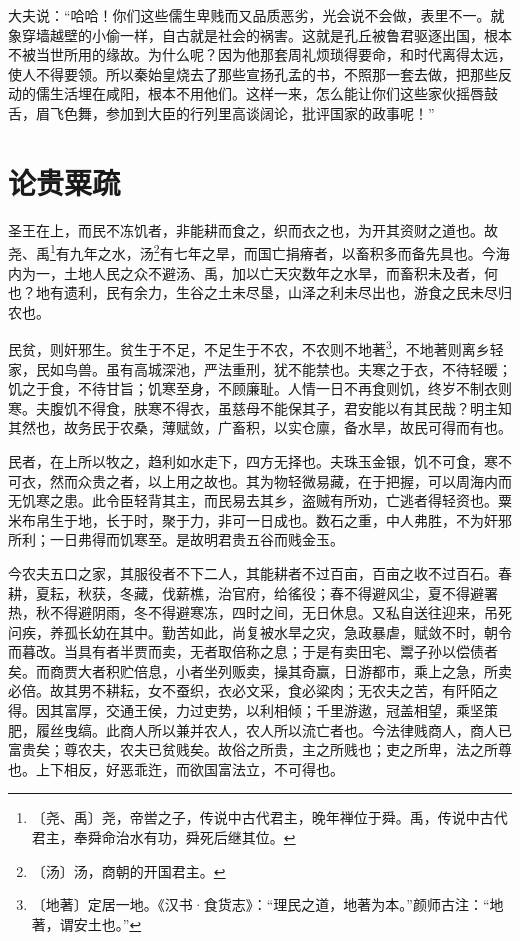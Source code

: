 \documentclass[12pt,UTF-8,openany]{ctexbook}
\begin{document}
\begin{normalsize}
    大夫说：“哈哈！你们这些儒生卑贱而又品质恶劣，光会说不会做，表里不一。就象穿墙越壁的小偷一样，自古就是社会的祸害。这就是孔丘被鲁君驱逐出国，根本不被当世所用的缘故。为什么呢？因为他那套周礼烦琐得要命，和时代离得太远，使人不得要领。所以秦始皇烧去了那些宣扬孔孟的书，不照那一套去做，把那些反动的儒生活埋在咸阳，根本不用他们。这样一来，怎么能让你们这些家伙摇唇鼓舌，眉飞色舞，参加到大臣的行列里高谈阔论，批评国家的政事呢！”
    
\end{normalsize}



\chapter{论贵粟疏}

\begin{normalsize}
    
    圣王在上，而民不冻饥者，非能耕而食之，织而衣之也，为开其资财之道也。故尧、禹\footnote{〔尧、禹〕尧，帝喾之子，传说中古代君主，晚年禅位于舜。禹，传说中古代君主，奉舜命治水有功，舜死后继其位。}有九年之水，汤\footnote{〔汤〕汤，商朝的开国君主。}有七年之旱，而国亡捐瘠者，以畜积多而备先具也。今海内为一，土地人民之众不避汤、禹，加以亡天灾数年之水旱，而畜积未及者，何也？地有遗利，民有余力，生谷之土未尽垦，山泽之利未尽出也，游食之民未尽归农也。
    
    民贫，则奸邪生。贫生于不足，不足生于不农，不农则不地著\footnote{〔地著〕定居一地。《汉书·食货志》：“理民之道，地著为本。”颜师古注：“地著，谓安土也。”}，不地著则离乡轻家，民如鸟兽。虽有高城深池，严法重刑，犹不能禁也。夫寒之于衣，不待轻暖；饥之于食，不待甘旨；饥寒至身，不顾廉耻。人情一日不再食则饥，终岁不制衣则寒。夫腹饥不得食，肤寒不得衣，虽慈母不能保其子，君安能以有其民哉？明主知其然也，故务民于农桑，薄赋敛，广畜积，以实仓廪，备水旱，故民可得而有也。
    
    民者，在上所以牧之，趋利如水走下，四方无择也。夫珠玉金银，饥不可食，寒不可衣，然而众贵之者，以上用之故也。其为物轻微易藏，在于把握，可以周海内而无饥寒之患。此令臣轻背其主，而民易去其乡，盗贼有所劝，亡逃者得轻资也。粟米布帛生于地，长于时，聚于力，非可一日成也。数石之重，中人弗胜，不为奸邪所利；一日弗得而饥寒至。是故明君贵五谷而贱金玉。
    
    今农夫五口之家，其服役者不下二人，其能耕者不过百亩，百亩之收不过百石。春耕，夏耘，秋获，冬藏，伐薪樵，治官府，给徭役；春不得避风尘，夏不得避署热，秋不得避阴雨，冬不得避寒冻，四时之间，无日休息。又私自送往迎来，吊死问疾，养孤长幼在其中。勤苦如此，尚复被水旱之灾，急政暴虐，赋敛不时，朝令而暮改。当具有者半贾而卖，无者取倍称之息；于是有卖田宅、鬻子孙以偿债者矣。而商贾大者积贮倍息，小者坐列贩卖，操其奇赢，日游都市，乘上之急，所卖必倍。故其男不耕耘，女不蚕织，衣必文采，食必粱肉；无农夫之苦，有阡陌之得。因其富厚，交通王侯，力过吏势，以利相倾；千里游遨，冠盖相望，乘坚策肥，履丝曳缟。此商人所以兼并农人，农人所以流亡者也。今法律贱商人，商人已富贵矣；尊农夫，农夫已贫贱矣。故俗之所贵，主之所贱也；吏之所卑，法之所尊也。上下相反，好恶乖迕，而欲国富法立，不可得也。
    

\end{normalsize}
\end{document}
